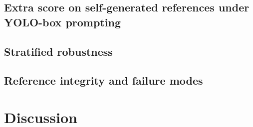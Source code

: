 \documentclass{elektr}
\begin{document}
\subsection*{Extra score on self-generated references under YOLO-box prompting}

\subsection*{Stratified robustness}

\subsection*{Reference integrity and failure modes}

\section*{Discussion} \label{sec:discussion}
\end{document}
